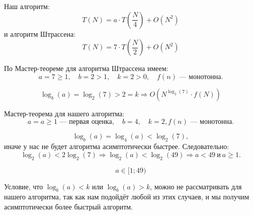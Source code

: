 \documentclass[12pt]{article}
\begin{document}
Наш алгоритм:
\[
T(N) = a \cdot T\left(\frac{N}{4}\right) + O(N^2)
\]
и алгоритм Штрассена:
\[
T(N) = 7 \cdot T\left(\frac{N}{2}\right) + O(N^2)
\]

По Мастер-теореме для алгоритма Штрассена имеем:
\[
a = 7 \ge 1, \quad b = 2 > 1, \quad k = 2 > 0, \quad f(n) \text{ --- монотонна.}
\]

\[
\log_b(a) = \log_2(7) > 2 = k \Rightarrow O(N^{\log_2(7)} \cdot f(N))
\]

Мастер-теорема для нашего алгоритма:
\[
a = a \ge 1 \text{ --- первая оценка}, \quad b = 4, \quad k = 2, f(n) \text{ --- монотонна.}
\]

\[
\log_b(a) = \log_4(a) < \log_2(7),
\]
иначе у нас не будет алгоритма асимптотически быстрее. Следовательно:
\[
\log_2(a) < 2\log_2(7) \Rightarrow \log_2(a) < \log_2(49) \Rightarrow a < 49 \ \text{и} \ a \ge 1.
\]

\[
\boxed{a \in [1; 49)}
\]

Условие, что \(\log_b(a) < k\) или \(\log_b(a) > k\), можно не рассматривать для нашего алгоритма, так как нам подойдёт любой из этих случаев, и мы получим асимптотически более быстрый алгоритм.
\end{document}
